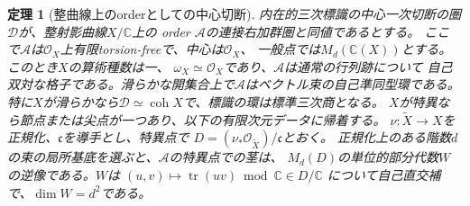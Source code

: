 \documentclass[11pt,a4paper]{ltjsarticle}
\newtheorem{theorem}{定理}[section]
\theoremstyle{definition}
\newcommand{\coh}{\operatorname{coh}}
\begin{document}
\begin{theorem}[整曲線上のorderとしての中心切断]
\label{thm:ou-central-slice-orders}
内在的三次標識の中心一次切断の圏$\mathcal D$が、整射影曲線$X/\mathbb C$上の
order $\mathcal A$の連接右加群圏と同値であるとする。
ここで$\mathcal A$は$\mathcal O_X$上有限torsion-freeで、中心は$\mathcal O_X$、
一般点では$M_d(\mathbb C(X))$とする。このとき$X$の算術種数は一、
$\omega_X\simeq\mathcal O_X$であり、$\mathcal A$は通常の行列跡について
自己双対な格子である。滑らかな開集合上で$\mathcal A$はベクトル束の自己準同型環である。
特に$X$が滑らかなら$\mathcal D\simeq\coh X$で、標識の環は標準三次商となる。
$X$が特異なら節点または尖点が一つあり、以下の有限次元データに帰着する。
$\nu:\widetilde X\to X$を正規化、$\mathfrak c$を導手とし、特異点で
$D=(\nu_*\mathcal O_{\widetilde X})/\mathfrak c$とおく。
正規化上のある階数$d$の束の局所基底を選ぶと、$\mathcal A$の特異点での茎は、
$M_d(D)$の単位的部分代数$W$の逆像である。$W$は
$(u,v)\mapsto\operatorname{tr}(uv)\bmod\mathbb C\in D/\mathbb C$
について自己直交補で、$\dim W=d^2$である。
\end{theorem}
\end{document}
